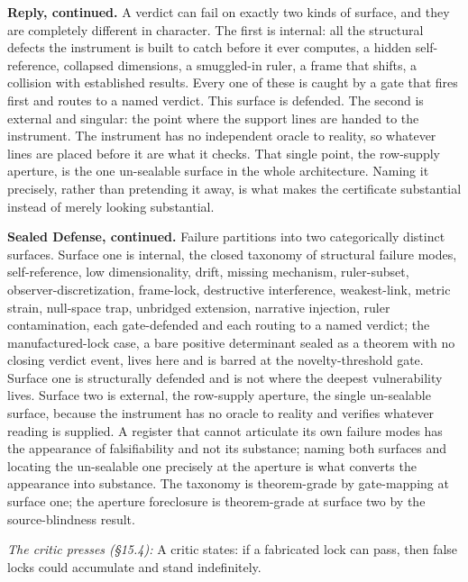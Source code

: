 \documentclass[10pt,twocolumn]{article}
\begin{document}
\textbf{Reply, continued.} A verdict can fail on exactly two kinds of
surface, and they are completely different in character. The first is
internal: all the structural defects the instrument is built to catch
before it ever computes, a hidden self-reference, collapsed dimensions,
a smuggled-in ruler, a frame that shifts, a collision with established
results. Every one of these is caught by a gate that fires first and
routes to a named verdict. This surface is defended. The second is
external and singular: the point where the support lines are handed to
the instrument. The instrument has no independent oracle to reality, so
whatever lines are placed before it are what it checks. That single
point, the row-supply aperture, is the one un-sealable surface in the
whole architecture. Naming it precisely, rather than pretending it away,
is what makes the certificate substantial instead of merely looking
substantial.

\textbf{Sealed Defense, continued.} Failure partitions into two
categorically distinct surfaces. Surface one is internal, the closed
taxonomy of structural failure modes, self-reference, low
dimensionality, drift, missing mechanism, ruler-subset,
observer-discretization, frame-lock, destructive interference,
weakest-link, metric strain, null-space trap, unbridged extension,
narrative injection, ruler contamination, each gate-defended and each
routing to a named verdict; the manufactured-lock case, a bare positive
determinant sealed as a theorem with no closing verdict event, lives
here and is barred at the novelty-threshold gate. Surface one is
structurally defended and is not where the deepest vulnerability lives.
Surface two is external, the row-supply aperture, the single un-sealable
surface, because the instrument has no oracle to reality and verifies
whatever reading is supplied. A register that cannot articulate its own
failure modes has the appearance of falsifiability and not its
substance; naming both surfaces and locating the un-sealable one
precisely at the aperture is what converts the appearance into
substance. The taxonomy is theorem-grade by gate-mapping at surface one;
the aperture foreclosure is theorem-grade at surface two by the
source-blindness result.

\emph{The critic presses (§15.4):} A critic states: if a fabricated lock
can pass, then false locks could accumulate and stand indefinitely.
\end{document}
